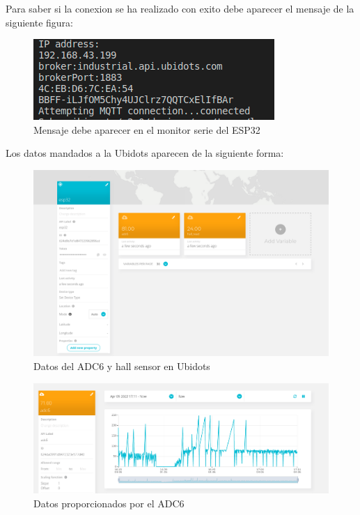 \documentclass[11pt, letterpaper]{article}
\begin{document}
Para saber si la conexion se ha realizado con exito debe aparecer el mensaje de la siguiente figura:

\begin{figure}[h]
	\centering
	\includegraphics[width=\textwidth]{Mensaje_bienconectado.png}
	\caption{Mensaje debe aparecer en el monitor serie del ESP32}
	\label{fig:mensaje_bien_conectado}
\end{figure}
\pagebreak

Los datos mandados a la Ubidots aparecen de la siguiente forma:
\begin{figure}[h]
	\centering
	\includegraphics[width=\textwidth]{datos_esp32_ubidots.png}
	\caption{Datos del ADC6 y hall sensor en Ubidots} 
	\label{fig:datos_esp32_ubidots}
\end{figure}
\pagebreak
\begin{figure}[h]
	\centering
	\includegraphics[width=\textwidth]{datos_ADC6.png}
	\caption{Datos proporcionados por el ADC6} 
	\label{fig:datos_esp32_ubidots}
\end{figure}
\end{document}
